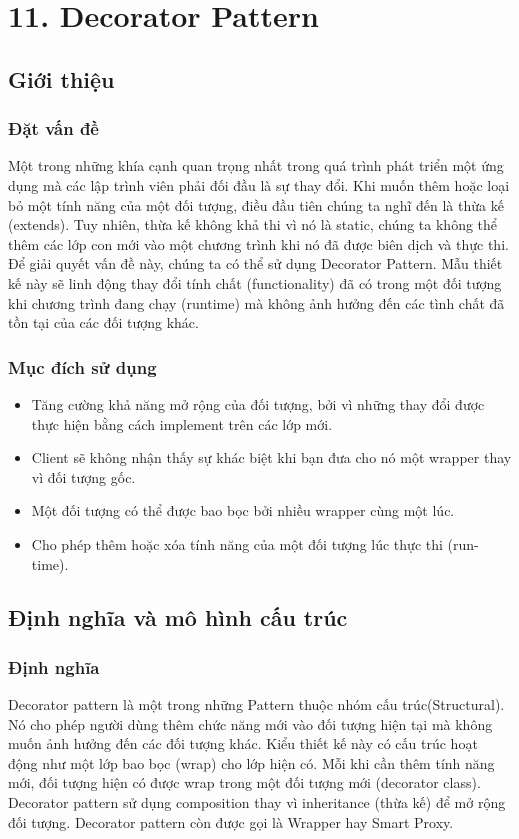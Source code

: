 \chapter{11. Decorator Pattern}
\section{Giới thiệu}
\subsection{Đặt vấn đề}
Một trong những khía cạnh quan trọng nhất trong quá trình phát triển một ứng dụng mà các lập trình viên phải đối đầu là sự thay đổi. Khi muốn thêm hoặc loại bỏ một tính năng của một đối tượng, điều đầu tiên chúng ta nghĩ đến là thừa kế (extends). Tuy nhiên, thừa kế không khả thi vì nó là static, chúng ta không thể thêm các lớp con mới vào một chương trình khi nó đã được biên dịch và thực thi.\\
Để giải quyết vấn đề này, chúng ta có thể sử dụng Decorator Pattern. Mẫu thiết kế này sẽ linh động thay đổi tính chất (functionality) đã có trong một đối tượng khi chương trình đang chạy (runtime) mà không ảnh hưởng đến các tình chất đã tồn tại của các đối tượng khác.
\subsection{Mục đích sử dụng}
\begin{itemize}
    \item Tăng cường khả năng mở rộng của đối tượng, bởi vì những thay đổi được thực hiện bằng cách implement trên các lớp mới.
    \item Client sẽ không nhận thấy sự khác biệt khi bạn đưa cho nó một wrapper thay vì đối tượng gốc.
    \item Một đối tượng có thể được bao bọc bởi nhiều wrapper cùng một lúc.
    \item Cho phép thêm hoặc xóa tính năng của một đối tượng lúc thực thi (run-time).
\end{itemize}

\section{Định nghĩa và mô hình cấu trúc}
\subsection{Định nghĩa}
Decorator pattern là một trong những Pattern thuộc nhóm cấu  trúc(Structural). Nó cho phép người dùng thêm chức năng mới vào đối tượng hiện tại mà không muốn ảnh hưởng đến các đối tượng khác. Kiểu thiết kế này có cấu trúc hoạt động như một lớp bao bọc (wrap) cho lớp hiện có. Mỗi khi cần thêm tính năng mới, đối tượng hiện có được wrap trong một đối tượng mới (decorator class).\\
Decorator pattern sử dụng composition thay vì inheritance (thừa kế) để mở rộng đối tượng. Decorator pattern còn được gọi là Wrapper hay Smart Proxy.
